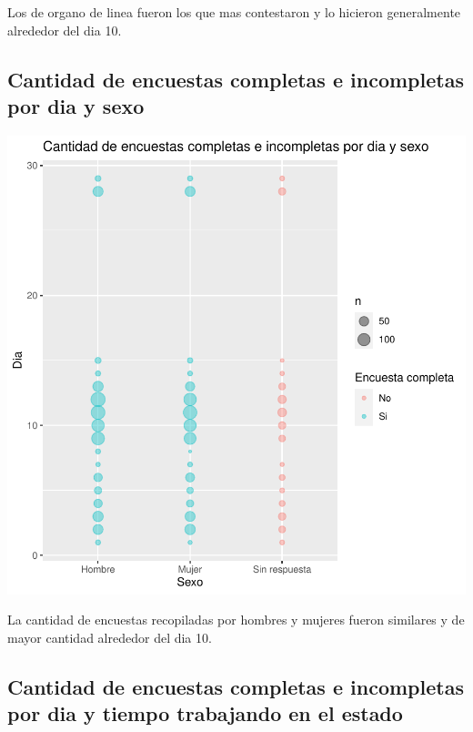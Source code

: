\documentclass{article}
\begin{document}
Los de organo de linea fueron los que mas contestaron y lo hicieron generalmente alrededor del dia 10.

\subsection{Cantidad de encuestas completas e incompletas por dia y sexo}

\includegraphics{seguimientov3-048}

La cantidad de encuestas recopiladas por hombres y mujeres fueron similares y de mayor cantidad alrededor del dia 10.

\subsection{Cantidad de encuestas completas e incompletas por dia y tiempo trabajando en el estado}
\end{document}
